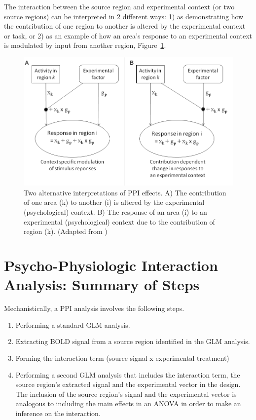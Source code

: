 The interaction between the source region and experimental context (or two source regions) can be interpreted in 2 different ways: 1) as demonstrating how the contribution of one region to another is altered by the experimental context or task, or 2) as an example of how an area's response to an experimental context is modulated by input from another region, Figure~\ref{fig:ppi2}.\\

\begin{figure}[!h]
	\includegraphics[width=120mm]{ppi/figures/Fig2.png}
	\caption{Two alternative interpretations of PPI effects. A) The contribution of one area (k) to another (i) is altered by the experimental (psychological) context. B) The response of an area (i) to an experimental (psychological) context due to the contribution of region (k). (Adapted from \cite{ppi})}
	\label{fig:ppi2}
\end{figure}

\section{Psycho-Physiologic Interaction Analysis: Summary of Steps}
Mechanistically, a PPI analysis involves the following steps.
\begin{enumerate}
\item Performing a standard GLM analysis.
\item Extracting BOLD signal from a source region identified in the GLM analysis.
\item Forming the interaction term (source signal x experimental treatment)
\item Performing a second GLM analysis that includes the interaction term, the source region's extracted signal and the experimental vector in the design. The inclusion of the source region's signal and the experimental vector is analogous to including the main effects in an ANOVA in order to make an inference on the interaction.
\end{enumerate} 

